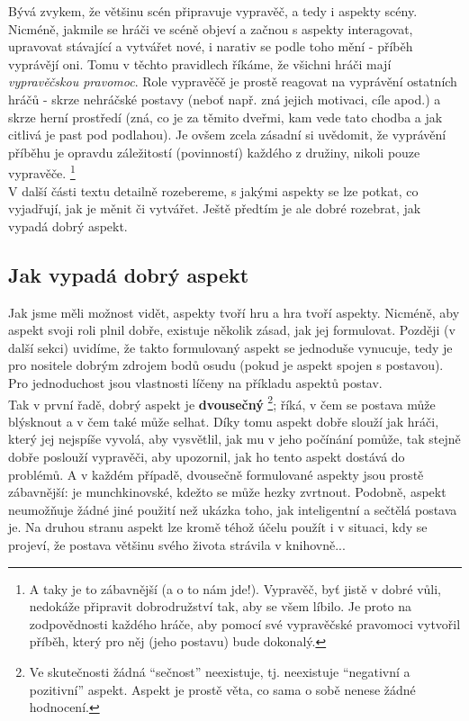 Bývá zvykem, že většinu scén připravuje vypravěč, a tedy i aspekty scény. Nicméně, jakmile se hráči ve scéně objeví a začnou s aspekty interagovat, upravovat stávající a vytvářet nové, i narativ se podle toho mění - příběh vyprávějí oni. Tomu v těchto pravidlech říkáme, že všichni hráči mají \textit{vypravěčskou pravomoc}. Role vypravěčě je prostě reagovat na vyprávění ostatních hráčů - skrze nehráčské postavy (neboť např. zná jejich motivaci, cíle apod.) a skrze herní prostředí (zná, co je za těmito dveřmi, kam vede tato chodba a jak citlivá je past pod podlahou). Je ovšem zcela zásadní si uvědomit, že vyprávění příběhu je opravdu záležitostí (povinností) každého z družiny, nikoli pouze vypravěče. \footnote{A taky je to zábavnější (a o to nám jde!). Vypravěč, byť jistě v dobré vůli, nedokáže připravit dobrodružství tak, aby se všem líbilo. Je proto na zodpovědnosti každého hráče, aby pomocí své vypravěčské pravomoci vytvořil příběh, který pro něj (jeho postavu) bude dokonalý.} \\

V další části textu detailně rozebereme, s jakými aspekty se lze potkat, co vyjadřují, jak je měnit či vytvářet. Ještě předtím je ale dobré rozebrat, jak vypadá dobrý aspekt.

\subsection{Jak vypadá dobrý aspekt}
\label{sec:jakvypadadobry}

Jak jsme měli možnost vidět, aspekty tvoří hru a hra tvoří aspekty. Nicméně, aby aspekt svoji roli plnil dobře, existuje několik zásad, jak jej formulovat. Později (v další sekci) uvidíme, že takto formulovaný aspekt se jednoduše vynucuje, tedy je pro nositele dobrým zdrojem bodů osudu (pokud je aspekt spojen s postavou). Pro jednoduchost jsou vlastnosti líčeny na příkladu aspektů postav.\\

Tak v první řadě, dobrý aspekt je \textbf{dvousečný} \footnote{Ve skutečnosti žádná ``sečnost'' neexistuje, tj. neexistuje ``negativní a pozitivní'' aspekt. Aspekt je prostě věta, co sama o sobě nenese žádné hodnocení.}; říká, v čem se postava může blýsknout a v čem také může selhat. Díky tomu aspekt dobře slouží jak hráči, který jej nejspíše vyvolá, aby vysvětlil, jak mu v jeho počínání pomůže, tak stejně dobře poslouží vypravěči, aby upozornil, jak ho tento aspekt dostává do problémů. A v každém případě, dvousečně formulované aspekty jsou prostě zábavnější:  je munchkinovské, kdežto  se může hezky zvrtnout. Podobně, aspekt  neumožňuje žádné jiné použití než ukázka toho, jak inteligentní a sečtělá postava je. Na druhou stranu aspekt  lze kromě téhož účelu použít i v situaci, kdy se projeví, že postava většinu svého života strávila v knihovně...

